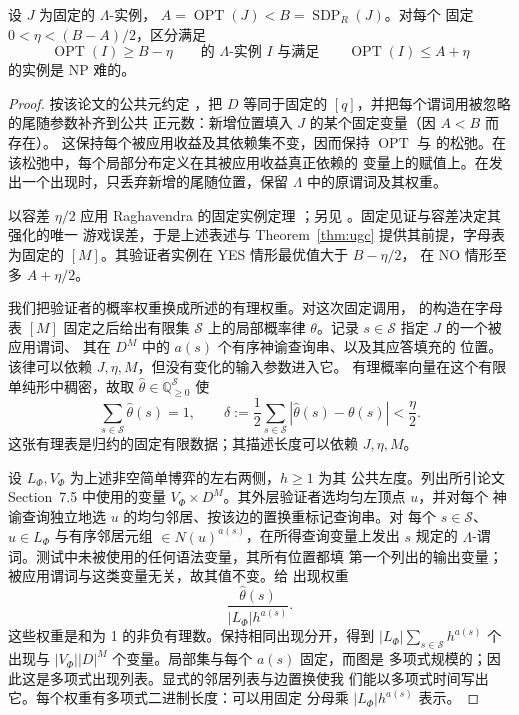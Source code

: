 \begin{corollary}[Raghavendra 推论]\label{cor:raghavendra-consequence}
设 \(J\) 为固定的 \(\Lambda\)-实例，
\(A=\operatorname{OPT}(J)<B=\operatorname{SDP}_{R}(J)\)。对每个
固定 \(0<\eta<(B-A)/2\)，区分满足
\[
 \operatorname{OPT}(I)\ge B-\eta
 \qquad\text{的 \(\Lambda\)-实例 \(I\) 与满足}\qquad
 \operatorname{OPT}(I)\le A+\eta
\]
的实例是 NP 难的。
\end{corollary}
\begin{proof}
按该论文的公共元约定
\cite[Definitions~7.2.1--7.2.2]{RaghavendraThesis09}，把 \(D\)
等同于固定的 \([q]\)，并把每个谓词用被忽略的尾随参数补齐到公共
正元数：新增位置填入 \(J\) 的某个固定变量（因 \(A<B\) 而存在）。
这保持每个被应用收益及其依赖集不变，因而保持
\(\operatorname{OPT}\) 与 \cite[Section~4.5]{RaghavendraThesis09}
的松弛。在该松弛中，每个局部分布定义在其被应用收益真正依赖的
变量上的赋值上。在发出一个出现时，只丢弃新增的尾随位置，保留
\(\Lambda\) 中的原谓词及其权重。

以容差 \(\eta/2\) 应用 Raghavendra 的固定实例定理
\cite[Theorem~7.9]{RaghavendraThesis09}；另见 \cite[Theorem~1.1
and Lemma~2.3]{Raghavendra08}。固定见证与容差决定其强化的唯一
游戏误差，于是上述表述与 Theorem~\ref{thm:ugc} 提供其前提，字母表
为固定的 \([M]\)。其验证者实例在 YES 情形最优值大于 \(B-\eta/2\)，
在 NO 情形至多 \(A+\eta/2\)。

我们把验证者的概率权重换成所述的有理权重。对这次固定调用，
\cite[Sections~7.3.1 and~7.5]{RaghavendraThesis09} 的构造在字母表
\([M]\) 固定之后给出有限集 \(\mathcal S\) 上的局部概率律
\(\theta\)。记录 \(s\in\mathcal S\) 指定 \(J\) 的一个被应用谓词、
其在 \(D^M\) 中的 \(a(s)\) 个有序神谕查询串、以及其应答填充的
位置。该律可以依赖 \(J,\eta,M\)，但没有变化的输入参数进入它。
有理概率向量在这个有限单纯形中稠密，故取
\(\widehat\theta\in\mathbb Q_{\ge0}^{\mathcal S}\) 使
\[
 \sum_{s\in\mathcal S}\widehat\theta(s)=1,
 \qquad
 \delta:=\frac12\sum_{s\in\mathcal S}
       |\widehat\theta(s)-\theta(s)|<\frac{\eta}{2}.
\]
这张有理表是归约的固定有限数据；其描述长度可以依赖
\(J,\eta,M\)。

设 \(L_\Phi,V_\Phi\) 为上述非空简单博弈的左右两侧，\(h\ge1\) 为其
公共左度。列出所引论文 Section~7.5 中使用的变量
\(V_\Phi\times D^M\)。其外层验证者选均匀左顶点 \(u\)，并对每个
神谕查询独立地选 \(u\) 的均匀邻居、按该边的置换重标记查询串。对
每个 \(s\in\mathcal S\)、\(u\in L_\Phi\) 与有序邻居元组
\(\in N(u)^{a(s)}\)，在所得查询变量上发出 \(s\) 规定的
\(\Lambda\)-谓词。测试中未被使用的任何语法变量，其所有位置都填
第一个列出的输出变量；被应用谓词与这类变量无关，故其值不变。给
出现权重
\[
 \frac{\widehat\theta(s)}{|L_\Phi|h^{a(s)}}.
\]
这些权重是和为 1 的非负有理数。保持相同出现分开，得到
\(|L_\Phi|\sum_{s\in\mathcal S}h^{a(s)}\) 个出现与
\(|V_\Phi||D|^M\) 个变量。局部集与每个 \(a(s)\) 固定，而图是
多项式规模的；因此这是多项式出现列表。显式的邻居列表与边置换使我
们能以多项式时间写出它。每个权重有多项式二进制长度：可以用固定
分母乘 \(|L_\Phi|h^{a(s)}\) 表示。


\end{proof}
